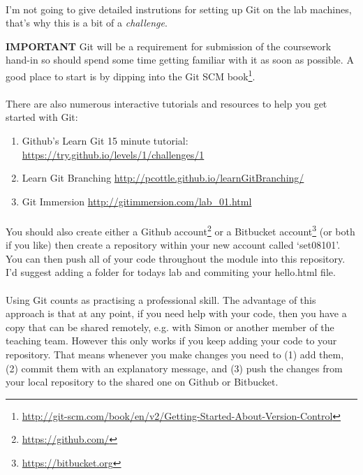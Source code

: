 \documentclass[10pt, a4paper, twosize]{article}
\begin{document}
\paragraph{} I'm not going to give detailed instrutions for setting up Git on the lab machines, that's why this is a bit of a \emph{challenge}.

\begin{framed}
\textbf{IMPORTANT} Git will be a requirement for submission of the coursework hand-in so should spend some time getting familiar with it as soon as possible. A good place to start is by dipping into the Git SCM book\footnote{\url{http://git-scm.com/book/en/v2/Getting-Started-About-Version-Control}}.
\end{framed}

\paragraph{} There are also numerous interactive tutorials and resources to help you get started with Git:
\begin{enumerate}
\item Github's Learn Git 15 minute tutorial: \url{https://try.github.io/levels/1/challenges/1}
\item Learn Git Branching \url{http://pcottle.github.io/learnGitBranching/}
\item Git Immersion \url{http://gitimmersion.com/lab_01.html}
\end{enumerate}

\paragraph{} You should also create either a Github account\footnote{\url{https://github.com/}} or a Bitbucket account\footnote{\url{https://bitbucket.org}} (or both if you like) then create a repository within your new account called `set08101'. You can then push all of your code throughout the module into this repository. I'd suggest adding a folder for todays lab and commiting your hello.html file. 

\paragraph{} Using Git counts as practising a professional skill. The advantage of this approach is that at any point, if you need help with your code, then you have a copy that can be shared remotely, e.g. with Simon or another member of the teaching team. However this only works if you keep adding your code to your repository. That means whenever you make changes you need to (1) add them, (2) commit them with an explanatory message,  and (3) push the changes from your local repository to the shared one on Github or Bitbucket.







\end{document}
